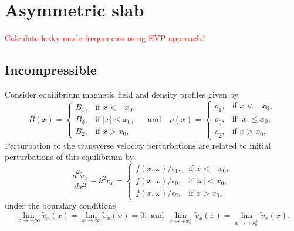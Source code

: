 \documentclass[12pt]{../style-files/ociamthesis}
\begin{document}
\section{Asymmetric slab}
\label{sec: IVP slab}

\textcolor{red}{Calculate leaky mode frequencies using EVP approach?}

\subsection{Incompressible}

Consider equilibrium magnetic field and density profiles given by
\begin{equation}
B(x)=
\begin{cases}
B_1, & \text{if  }x<-x_0, \\
B_0, & \text{if }|x|\leq{x_0}, \\
B_2, & \text{if  }x>x_0,
\end{cases}
\quad \text{and} \quad
\rho(x)=
\begin{cases}
\rho_1, & \text{if  }x<-x_0, \\
\rho_0, & \text{if }|x|\leq{x_0}, \\
\rho_2, & \text{if  }x>x_0,
\end{cases}
\end{equation}
Perturbation to the transverse velocity perturbations are related to initial perturbations of this equilibrium by
\begin{equation}
\frac{d^2\tilde{v}_x}{dx^2} - k^2\tilde{v}_x = 
\begin{cases}
f(x, \omega)/\epsilon_1, & \text{if  } x<-x_0,\\
f(x, \omega)/\epsilon_0, & \text{if  } |x|<x_0,\\
f(x, \omega)/\epsilon_2, & \text{if  } x>x_0,
\end{cases}
\label{ivp gov slab 2}
\end{equation}
under the boundary conditions
\begin{equation}
\lim_{x \to -\infty}\tilde{v}_x(x) = \lim_{x \to \infty}\tilde{v}_x(x) = 0, \text{ and } \lim_{x \to \pm x_0^-}\tilde{v}_x(x) = \lim_{x \to \pm x_0^+}\tilde{v}_x(x).
\label{ivp slab BC}
\end{equation}
\end{document}
